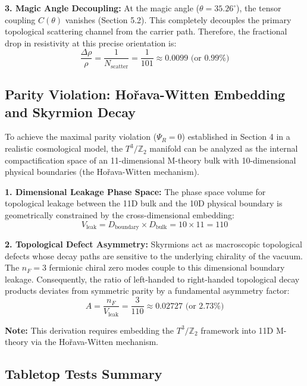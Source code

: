 \documentclass[12pt,a4paper]{article}
\newcommand{\Ztwo}{\mathbb{Z}_2}
\newcommand{\Tthree}{T^3}
\newcommand{\nF}{n_F}
\begin{document}
\textbf{3. Magic Angle Decoupling:}
At the magic angle ($\theta = 35.26^\circ$), the tensor coupling $C(\theta)$ vanishes (Section 5.2). This completely decouples the primary topological scattering channel from the carrier path. Therefore, the fractional drop in resistivity at this precise orientation is:
\begin{equation}
\frac{\Delta \rho}{\rho} = \frac{1}{N_{\text{scatter}}} = \frac{1}{101} \approx 0.0099 \text{ (or } 0.99\%)
\end{equation}

\subsection{Parity Violation: Hořava-Witten Embedding and Skyrmion Decay}

To achieve the maximal parity violation ($\Psi_R = 0$) established in Section 4 in a realistic cosmological model, the $\Tthree/\Ztwo$ manifold can be analyzed as the internal compactification space of an 11-dimensional M-theory bulk with 10-dimensional physical boundaries (the Hořava-Witten mechanism).

\textbf{1. Dimensional Leakage Phase Space:}
The phase space volume for topological leakage between the 11D bulk and the 10D physical boundary is geometrically constrained by the cross-dimensional embedding:
\begin{equation}
V_{\text{leak}} = D_{\text{boundary}} \times D_{\text{bulk}} = 10 \times 11 = 110
\end{equation}

\textbf{2. Topological Defect Asymmetry:}
Skyrmions act as macroscopic topological defects whose decay paths are sensitive to the underlying chirality of the vacuum. The $\nF = 3$ fermionic chiral zero modes couple to this dimensional boundary leakage. Consequently, the ratio of left-handed to right-handed topological decay products deviates from symmetric parity by a fundamental asymmetry factor:
\begin{equation}
A = \frac{\nF}{V_{\text{leak}}} = \frac{3}{110} \approx 0.02727 \text{ (or } 2.73\%)
\end{equation}

\textbf{Note:} This derivation requires embedding the $\Tthree/\Ztwo$ framework into 11D M-theory via the Hořava-Witten mechanism.

\subsection{Tabletop Tests Summary}
\end{document}
